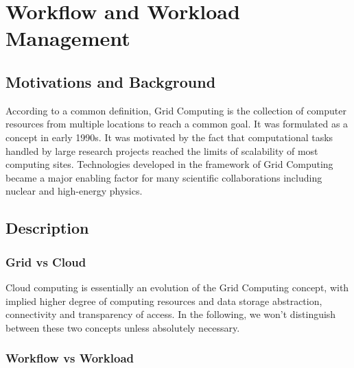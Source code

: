 \section{Workflow and Workload Management}

\subsection{Motivations and Background}
According to a common definition, Grid Computing is the collection of computer resources from multiple locations to reach a common goal. 
It was formulated as a concept in early 1990s. It was motivated by the fact that computational tasks handled by large research projects reached the limits of scalability of most computing sites.
Technologies developed in the framework of Grid Computing became a major enabling factor for many scientific collaborations including nuclear and high-energy physics.

\subsection{Description}
\subsubsection{Grid vs Cloud}

Cloud computing is essentially an evolution of the Grid Computing concept, with implied higher degree of computing resources and data storage abstraction, connectivity and transparency of access.
In the following, we won't distinguish between these two concepts unless absolutely necessary.\\

\subsubsection{Workflow vs Workload}

